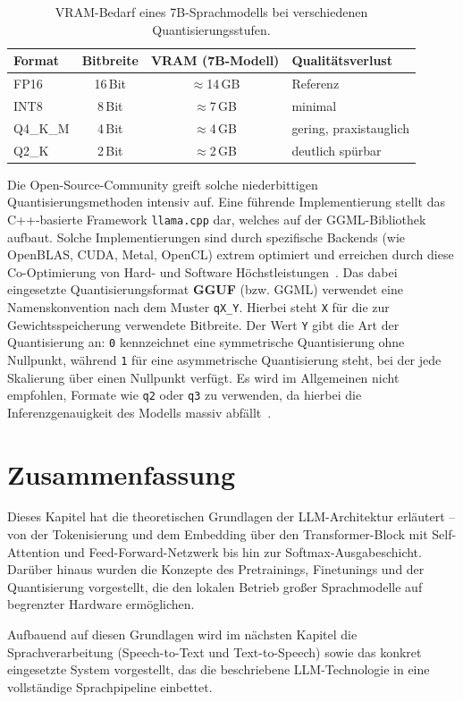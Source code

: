 \begin{table}[H]
    \centering
    \small
    \begin{tabular}{l c c l}
        \toprule
        Format       & Bitbreite & VRAM (7B-Modell) & Qualitätsverlust \\
        \midrule
        FP16         & 16\,Bit   & $\approx$14\,GB  & Referenz \\
        INT8         & 8\,Bit    & $\approx$7\,GB   & minimal \\
        Q4\_K\_M     & 4\,Bit    & $\approx$4\,GB   & gering, praxistauglich \\
        Q2\_K        & 2\,Bit    & $\approx$2\,GB   & deutlich spürbar \\
        \bottomrule
    \end{tabular}
    \caption{VRAM-Bedarf eines 7B-Sprachmodells bei verschiedenen
        Quantisierungsstufen.}
    \label{tab:quantisierung}
\end{table}

Die Open-Source-Community greift solche niederbittigen Quantisierungsmethoden intensiv auf. Eine führende Implementierung stellt das C++-basierte Framework \texttt{llama.cpp} dar, welches auf der GGML-Bibliothek aufbaut. Solche Implementierungen sind durch spezifische Backends (wie OpenBLAS, CUDA, Metal, OpenCL) extrem optimiert und erreichen durch diese Co-Optimierung von Hard- und Software Höchstleistungen~\cite{chen2025inferenceperformanceevaluationllms}.
Das dabei eingesetzte Quantisierungsformat \textbf{GGUF} (bzw. GGML) verwendet eine Namenskonvention nach dem Muster \texttt{qX\_Y}. Hierbei steht \texttt{X} für die zur Gewichtsspeicherung verwendete Bitbreite. Der Wert \texttt{Y} gibt die Art der Quantisierung an: \texttt{0} kennzeichnet eine symmetrische Quantisierung ohne Nullpunkt, während \texttt{1} für eine asymmetrische Quantisierung steht, bei der jede Skalierung über einen Nullpunkt verfügt. Es wird im Allgemeinen nicht empfohlen, Formate wie \texttt{q2} oder \texttt{q3} zu verwenden, da hierbei die Inferenzgenauigkeit des Modells massiv abfällt~\cite{chen2025inferenceperformanceevaluationllms}.


\section{Zusammenfassung}

Dieses Kapitel hat die theoretischen Grundlagen der
LLM-Architektur erläutert -- von der Tokenisierung und dem Embedding
über den Transformer-Block mit Self-Attention und Feed-Forward-Netzwerk
bis hin zur Softmax-Ausgabeschicht. Darüber hinaus wurden die Konzepte
des Pretrainings, Finetunings und der Quantisierung vorgestellt, die
den lokalen Betrieb großer Sprachmodelle auf begrenzter Hardware
ermöglichen.

Aufbauend auf diesen Grundlagen wird im nächsten Kapitel die
Sprachverarbeitung (Speech-to-Text und Text-to-Speech) sowie das
konkret eingesetzte System vorgestellt, das die beschriebene
LLM-Technologie in eine vollständige Sprachpipeline einbettet.
